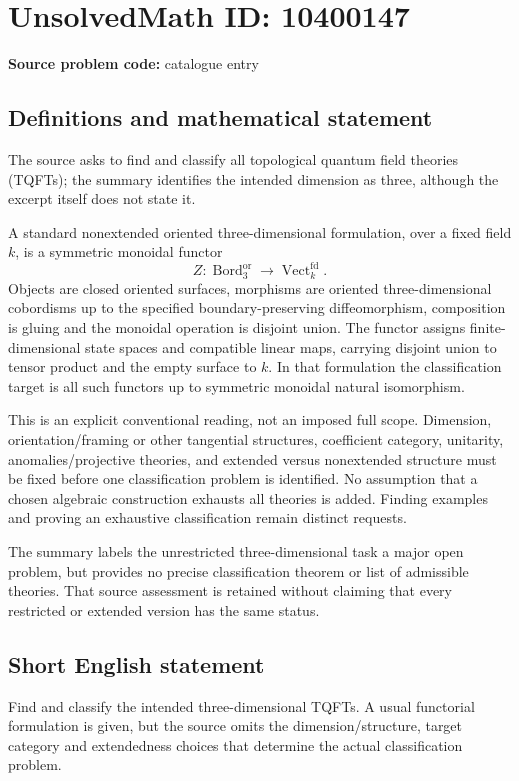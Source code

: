 \documentclass[11pt]{article}
\begin{document}
\section*{UnsolvedMath ID: 10400147}
\textbf{Source problem code:} catalogue entry
\subsection{Definitions and mathematical statement}
The source asks to find and classify all topological quantum field theories (TQFTs); the summary identifies the intended dimension as three, although the excerpt itself does not state it.

A standard nonextended oriented three-dimensional formulation, over a fixed field \(k\), is a symmetric monoidal functor
\[
 Z:\operatorname{Bord}^{\mathrm{or}}_3\longrightarrow\operatorname{Vect}^{\mathrm{fd}}_k.
\]
Objects are closed oriented surfaces, morphisms are oriented three-dimensional cobordisms up to the specified boundary-preserving diffeomorphism, composition is gluing and the monoidal operation is disjoint union. The functor assigns finite-dimensional state spaces and compatible linear maps, carrying disjoint union to tensor product and the empty surface to \(k\). In that formulation the classification target is all such functors up to symmetric monoidal natural isomorphism.

This is an explicit conventional reading, not an imposed full scope. Dimension, orientation/framing or other tangential structures, coefficient category, unitarity, anomalies/projective theories, and extended versus nonextended structure must be fixed before one classification problem is identified. No assumption that a chosen algebraic construction exhausts all theories is added. Finding examples and proving an exhaustive classification remain distinct requests.

The summary labels the unrestricted three-dimensional task a major open problem, but provides no precise classification theorem or list of admissible theories. That source assessment is retained without claiming that every restricted or extended version has the same status.
\subsection{Short English statement}
Find and classify the intended three-dimensional TQFTs. A usual functorial formulation is given, but the source omits the dimension/structure, target category and extendedness choices that determine the actual classification problem.
\end{document}
